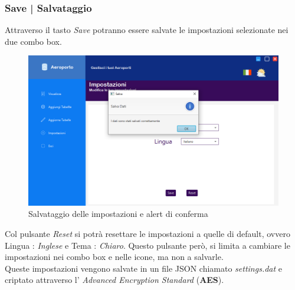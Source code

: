 
\pagebreak

\enlargethispage{1\linewidth}

\subsubsection{Save | Salvataggio}

\textsf{\small Attraverso il tasto \emph{Save} potranno essere salvate le impostazioni selezionate nei due combo box.}\\

\begin{figure}[H] 
	\centering
	\includegraphics[width=1\textwidth, height=1\textheight, keepaspectratio]{./img/Applicativo/salvataggio.png}
	\caption{Salvataggio delle impostazioni e alert di conferma}
	\label{fig:save_alert_success}
\end{figure}

\textsf{\small Col pulsante \emph{Reset} si potrà resettare le impostazioni a quelle di default, ovvero Lingua : \emph{Inglese} e Tema : \emph{Chiaro}. Questo pulsante però, si limita a cambiare le impostazioni nei combo box e nelle icone, ma non a salvarle.}\\

\textsf{\small Queste impostazioni vengono salvate in un file JSON chiamato \emph{settings.dat} e criptato attraverso l' \emph{Advanced Encryption Standard} (\textbf{AES}).}\\

